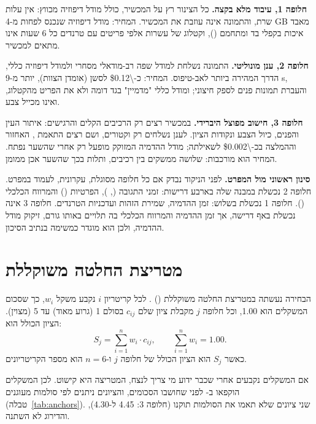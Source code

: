 \textbf{חלופה \num{1}, עיבוד מלא בקצה.} כל הצינור רץ על המכשיר, כולל מודל דיפוזיה מכווץ: אין עלות שרת, והתמונה אינה עוזבת את המכשיר. המחיר: מודל דיפוזיה שנכנס לפחות מ-\num{4 GB} מאבד איכות בקפלי בד ומתחמם (), וקטלוג של עשרות אלפי פריטים עם טרנדים כל \num{6} שעות אינו מתאים למכשיר.

\textbf{חלופה \num{2}, ענן מונוליטי.} התמונה נשלחת למודל שפה רב-מודאלי מסחרי ולמודל דיפוזיה כללי, הדרך המהירה ביותר לאב-טיפוס. המחיר: כ-\num{\$0.12} לסשן (אומדן הצוות), יותר מ-\num{9 s}, והעברת תמונות פנים לספק חיצוני; ומודל כללי "מדמיין" בגד דומה ולא את הפריט מהקטלוג, ואינו מכייל צבע.

\textbf{חלופה \num{3}, חישוב מפוצל היברידי.} במכשיר רצים רק הרכיבים הקלים והרגישים: איתור העין והפנים, כיול הצבע ונקודות הציון. לענן נשלחים רק וקטורים, ושם רצים התאמת , האחזור וההמלצה בכ-\num{\$0.002} לשאילתה; מודל ההדמיה המזוקק מופעל רק אחרי שהשער נפתח. המחיר הוא מורכבות: שלושה ממשקים בין רכיבים, ותלות בכך שהשער אכן ממומן.

\textbf{סינון ראשוני מול המפרט.} לפני הניקוד נבדק אם כל חלופה מסוגלת, עקרונית, לעמוד במפרט. חלופה \num{2} נכשלת במבנה שלה בארבע דרישות: זמני התגובה (, ), הפרטיות () והמרווח הכלכלי (). חלופה \num{1} נכשלת בשלוש: זמן ההדמיה, שמירת הזהות ועדכניות הטרנדים. חלופה \num{3} אינה נכשלת באף דרישה, אך זמן ההדמיה והמרווח הכלכלי בה תלויים באותו גורם, זיקוק מודל ההדמיה, ולכן הוא מוגדר כמשימה בנתיב הסיכון.

\section{מטריצת החלטה משוקללת}
\label{sec:pugh}

הבחירה נעשתה במטריצת החלטה משוקללת () \cite{pugh1991total}. לכל קריטריון $i$ נקבע משקל $w_i$, כך שסכום המשקלים הוא \num{1.00}, וכל חלופה $j$ מקבלת ציון שלם $c_{ij}$ בסולם \num{1} (גרוע מאוד) עד \num{5} (מצוין). הציון הכולל הוא:
\begin{equation}
S_j = \sum_{i=1}^{n} w_i \cdot c_{ij}, \qquad \sum_{i=1}^{n} w_i = 1.00 .
\label{eq:pugh}
\end{equation}
כאשר $S_j$ הוא הציון הכולל של חלופה $j$ ו-$n = 6$ הוא מספר הקריטריונים.

\begin{warningbox}
אם המשקלים נקבעים אחרי שכבר ידוע מי צריך לנצח, המטריצה היא קישוט. לכן המשקלים הוקפאו ב- לפני שחושבו הסכומים, והציונים ניתנים לפי סולמות מעוגנים (טבלה~\ref{tab:anchors}). שני ציונים שלא תאמו את הסולמות תוקנו (חלופה \num{3}: \num{4.45} ל-\num{4.30}), והדירוג לא השתנה.
\end{warningbox}

